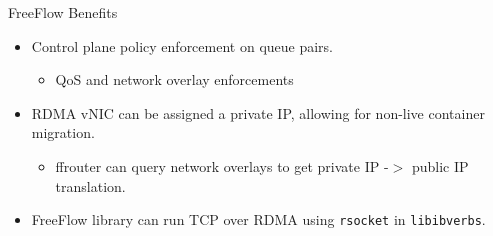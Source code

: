 \documentclass{beamer}
\begin{document}
\begin{frame}{FreeFlow Benefits}
    \begin{itemize}
        \item Control plane policy enforcement on queue pairs.
            \begin{itemize}
                \item QoS and network overlay enforcements
            \end{itemize}
        \item RDMA vNIC can be assigned a private IP, allowing for non-live container migration.
            \begin{itemize}
                \item ffrouter can query network overlays to get private IP -$>$ public IP translation.
            \end{itemize}
        \item FreeFlow library can run TCP over RDMA using \texttt{rsocket} in \texttt{libibverbs}.
    \end{itemize}
\end{frame}
\end{document}
